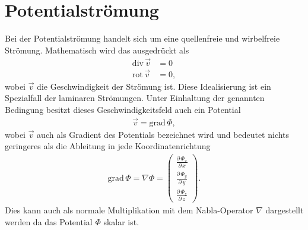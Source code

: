 %
%
%
%
\section{Potentialströmung\label{ueberschall:section:potentialstroemung}}
Bei der Potentialströmung handelt sich um eine quellenfreie 
und wirbelfreie Strömung.
Mathematisch wird das ausgedrückt als
\begin{align*}
    \mathrm{div}\,\vec{v} &= 0 \\
    \mathrm{rot}\,\vec{v} &= 0,
\end{align*}
wobei $\vec{v}$ die Geschwindigkeit der Strömung ist.
Diese Idealisierung ist ein Spezialfall der laminaren Strömungen.
Unter Einhaltung der genannten Bedingung besitzt dieses
Geschwindigkeitsfeld auch ein Potential
\begin{align}
    \vec{v} = \mathrm{grad}\,\Phi,\label{eq:potential}
\end{align}
wobei $\vec{v}$ auch als Gradient des Potentials bezeichnet wird
und bedeutet nichts geringeres als 
die Ableitung in jede Koordinatenrichtung
\begin{align}
    \mathrm{grad}\,\Phi
    =
    \nabla\Phi
    =
    \begin{pmatrix}
        \frac{\partial\,\Phi_x}{\partial\,x}\\
        \frac{\partial\,\Phi_y}{\partial\,y}\\
        \frac{\partial\,\Phi_z}{\partial\,z}
    \end{pmatrix}.
\end{align} 
Dies kann auch als normale Multiplikation mit dem Nabla-Operator $\nabla$
dargestellt werden da das Potential $\Phi$ skalar ist.

